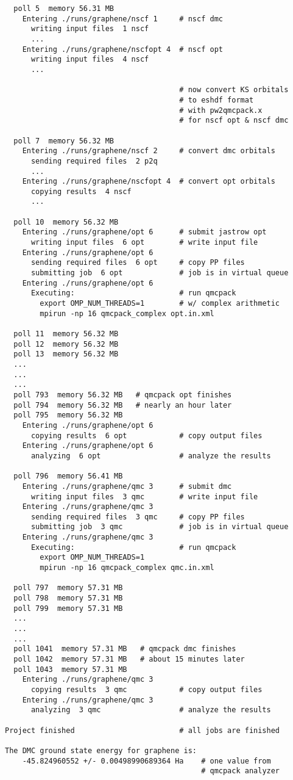 \documentclass[oneside,11pt]{memoir}
\numberwithin{equation}{section}
\begin{document}
\begin{shaded}
\begin{verbatim}
  poll 5  memory 56.31 MB               
    Entering ./runs/graphene/nscf 1     # nscf dmc 
      writing input files  1 nscf 
      ...
    Entering ./runs/graphene/nscfopt 4  # nscf opt 
      writing input files  4 nscf 
      ...

                                        # now convert KS orbitals
                                        # to eshdf format
                                        # with pw2qmcpack.x
                                        # for nscf opt & nscf dmc

  poll 7  memory 56.32 MB 
    Entering ./runs/graphene/nscf 2     # convert dmc orbitals
      sending required files  2 p2q 
      ...
    Entering ./runs/graphene/nscfopt 4  # convert opt orbitals
      copying results  4 nscf 
      ...

  poll 10  memory 56.32 MB 
    Entering ./runs/graphene/opt 6      # submit jastrow opt
      writing input files  6 opt        # write input file
    Entering ./runs/graphene/opt 6 
      sending required files  6 opt     # copy PP files
      submitting job  6 opt             # job is in virtual queue
    Entering ./runs/graphene/opt 6 
      Executing:                        # run qmcpack
        export OMP_NUM_THREADS=1        # w/ complex arithmetic
        mpirun -np 16 qmcpack_complex opt.in.xml 

  poll 11  memory 56.32 MB 
  poll 12  memory 56.32 MB 
  poll 13  memory 56.32 MB 
  ...
  ...
  ...
  poll 793  memory 56.32 MB   # qmcpack opt finishes
  poll 794  memory 56.32 MB   # nearly an hour later
  poll 795  memory 56.32 MB 
    Entering ./runs/graphene/opt 6 
      copying results  6 opt            # copy output files
    Entering ./runs/graphene/opt 6 
      analyzing  6 opt                  # analyze the results

  poll 796  memory 56.41 MB 
    Entering ./runs/graphene/qmc 3      # submit dmc
      writing input files  3 qmc        # write input file
    Entering ./runs/graphene/qmc 3 
      sending required files  3 qmc     # copy PP files
      submitting job  3 qmc             # job is in virtual queue
    Entering ./runs/graphene/qmc 3 
      Executing:                        # run qmcpack
        export OMP_NUM_THREADS=1
        mpirun -np 16 qmcpack_complex qmc.in.xml 

  poll 797  memory 57.31 MB 
  poll 798  memory 57.31 MB 
  poll 799  memory 57.31 MB 
  ...
  ...
  ...
  poll 1041  memory 57.31 MB   # qmcpack dmc finishes
  poll 1042  memory 57.31 MB   # about 15 minutes later
  poll 1043  memory 57.31 MB 
    Entering ./runs/graphene/qmc 3 
      copying results  3 qmc            # copy output files
    Entering ./runs/graphene/qmc 3 
      analyzing  3 qmc                  # analyze the results

Project finished                        # all jobs are finished
 
The DMC ground state energy for graphene is:
    -45.824960552 +/- 0.00498990689364 Ha    # one value from
                                             # qmcpack analyzer
\end{verbatim}
\end{shaded}
\end{document}
